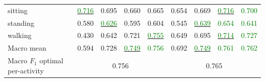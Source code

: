 \begin{table}[t]
\begin{tabularx}{\linewidth}{@{}>{\raggedright\arraybackslash}X cccc @{\hspace{1.5em}} cccc@{}}
    sitting & \underline{\textcolor{green}{0.716}} & 0.695 & 0.660 & 0.665 & 0.654 & 0.669 & \underline{\textcolor{green}{0.716}} & \textcolor{green}{0.700} \\
    standing & 0.580 & \underline{\textcolor{green}{0.626}} & 0.595 & 0.604 & 0.545 & \underline{\textcolor{green}{0.639}} & \textcolor{green}{0.654} & \textcolor{green}{0.641} \\
    walking & 0.430 & 0.642 & 0.721 & \underline{\textcolor{green}{0.755}} & 0.649 & 0.695 & \underline{\textcolor{green}{0.714}} & \textcolor{green}{0.727} \\
    \midrule
    Macro mean & 0.594 & 0.728 & \underline{\textcolor{green}{0.749}} & \textcolor{green}{0.756} & 0.692 & \underline{\textcolor{green}{0.749}} & \textcolor{green}{0.761} & \textcolor{green}{0.762} \\
    Macro $F_1$ optimal per-activity & \multicolumn{4}{c}{0.756} & \multicolumn{4}{c}{0.765} \\
    \bottomrule
  \end{tabularx}
\end{table}